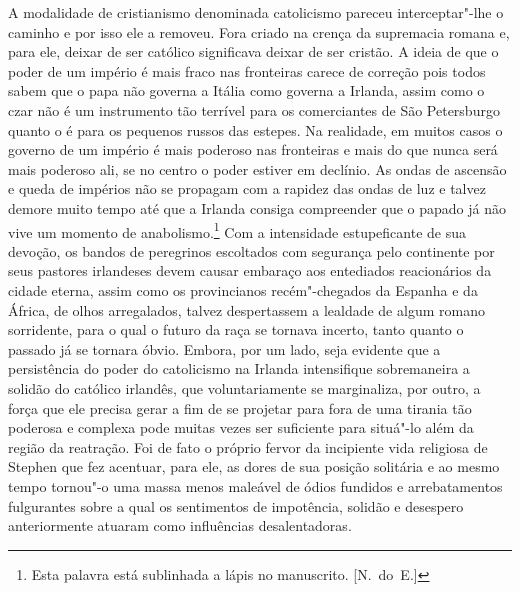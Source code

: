 A modalidade de cristianismo denominada catolicismo pareceu interceptar"-lhe o
caminho e por isso ele a removeu.  Fora criado na crença da supremacia romana
e, para ele, deixar de ser católico significava deixar de ser cristão.  A ideia
de que o poder de um império é mais fraco nas fronteiras carece de correção
pois todos sabem que o papa não governa a Itália como governa a Irlanda, assim
como o czar não é um instrumento tão terrível para os comerciantes de São
Petersburgo quanto o é para os pequenos russos das estepes.  Na realidade, em
muitos casos o governo de um império é mais poderoso nas fronteiras e mais do
que nunca será mais poderoso ali, se no centro o poder estiver em declínio.  As
ondas de ascensão e queda de impérios não se propagam com a rapidez das ondas
de luz e talvez demore muito tempo até que a Irlanda consiga compreender que o
papado já não vive um momento de anabolismo.\footnote{ Esta palavra está
sublinhada a lápis no manuscrito. [N.~do~E.]}  Com a intensidade estupeficante de		
sua devoção, os bandos de peregrinos escoltados com segurança pelo continente
por seus pastores irlandeses devem causar embaraço aos \mbox{entediados} reacionários
da cidade eterna, assim como os provincianos recém"-chegados da Espanha e da
África, de olhos arregalados, talvez despertassem a lealdade de algum romano
sorridente, para o qual o futuro da raça se
tornava incerto, tanto quanto o passado já se tornara óbvio.  Embora, por um
lado, seja evidente que a persistência do poder do catolicismo na Irlanda
intensifique sobremaneira a solidão do católico irlandês, que voluntariamente
se marginaliza, por outro, a força que ele precisa gerar a fim de se projetar
para fora de uma tirania tão poderosa e complexa pode muitas vezes ser
suficiente para situá"-lo além da região da reatração.  Foi de fato o próprio
fervor da incipiente vida religiosa de Stephen que fez acentuar, para ele, as
dores de sua posição solitária e ao mesmo tempo tornou"-o uma massa menos
maleável de ódios fundidos e arrebatamentos fulgurantes sobre a qual os
sentimentos de impotência, solidão e desespero anteriormente atuaram como
influências desalentadoras.

